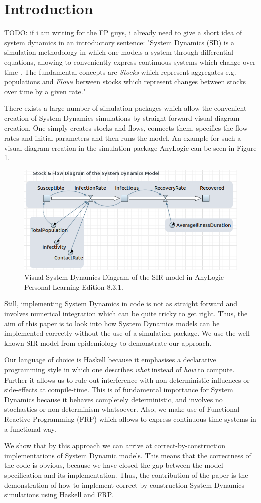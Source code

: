 \section{Introduction}
TODO: if i am writing for the FP guys, i already need to give a short idea of system dynamics in an introductory sentence: "System Dynamics (SD) is a simulation methodology in which one models a system through differential equations, allowing to conveniently express continuous systems which change over time \cite{porter_industrial_1962}. The fundamental concepts are \textit{Stocks} which represent aggregates e.g. populations and \textit{Flows} between stocks which represent changes between stocks over time by a given rate."

There exists a large number of simulation packages which allow the convenient creation of System Dynamics simulations by straight-forward visual diagram creation. One simply creates stocks and flows, connects them, specifies the flow-rates and initial parameters and then runs the model. An example for such a visual diagram creation in the simulation package AnyLogic can be seen in Figure \ref{fig:sir_stockflow_diagram}.

\begin{figure}
	\centering
	\includegraphics[width=.5\textwidth, angle=0]{./fig/SIR_SD_STOCKFLOW_DIAGRAMM.png}
	\caption{Visual System Dynamics Diagram of the SIR model in AnyLogic Personal Learning Edition 8.3.1.}
	\label{fig:sir_stockflow_diagram}
\end{figure}

Still, implementing System Dynamics in code is not as straight forward and involves numerical integration which can be quite tricky to get right. Thus, the aim of this paper is to look into how System Dynamics models can be implemented correctly without the use of a simulation package. We use the well known SIR model \cite{kermack_contribution_1927} from epidemiology to demonstrate our approach.

Our language of choice is Haskell because it emphasises a declarative programming style in which one describes \textit{what} instead of \textit{how} to compute. Further it allows us to rule out interference with non-deterministic influences or side-effects at compile-time. This is of fundamental importance for System Dynamics because it behaves completely deterministic, and involves no stochastics or non-determinism whatsoever. Also, we make use of Functional Reactive Programming (FRP) which allows to express continuous-time systems in a functional way. 

We show that by this approach we can arrive at correct-by-construction implementations of System Dynamic models. This means that the correctness of the code is obvious, because we have closed the gap between the model specification and its implementation. Thus, the contribution of the paper is the demonstration of how to implement correct-by-construction System Dynamics simulations using Haskell and FRP.